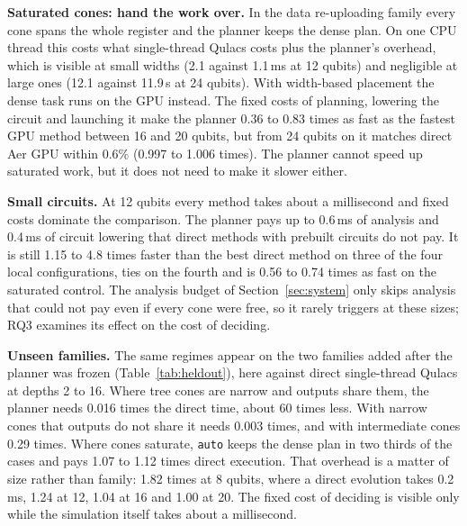 \textbf{Saturated cones: hand the work over.} In the data re-uploading family every cone spans the whole register and the planner keeps the dense plan. On one CPU thread this costs what single-thread Qulacs costs plus the planner's overhead, which is visible at small widths (2.1 against 1.1\,ms at 12 qubits) and negligible at large ones (12.1 against 11.9\,s at 24 qubits). With width-based placement the dense task runs on the GPU instead. The fixed costs of planning, lowering the circuit and launching it make the planner 0.36 to 0.83 times as fast as the fastest GPU method between 16 and 20 qubits, but from 24 qubits on it matches direct Aer GPU within 0.6\% (0.997 to 1.006 times). The planner cannot speed up saturated work, but it does not need to make it slower either.

\textbf{Small circuits.} At 12 qubits every method takes about a millisecond and fixed costs dominate the comparison. The planner pays up to 0.6\,ms of analysis and 0.4\,ms of circuit lowering that direct methods with prebuilt circuits do not pay. It is still 1.15 to 4.8 times faster than the best direct method on three of the four local configurations, ties on the fourth and is 0.56 to 0.74 times as fast on the saturated control. The analysis budget of Section~\ref{sec:system} only skips analysis that could not pay even if every cone were free, so it rarely triggers at these sizes; RQ3 examines its effect on the cost of deciding.

\begin{table}[!t]
\caption{Held-Out Families on One CPU Thread: Planner Time over Direct Qulacs and Cross-Validated Selection Regret, Medians per Stratum at One Collection. The Five Top Strata Are Disjoint and Sum to 480; the Width Rows Break Down Their 405-Case Saturated Subset and Are Not Added Again. F, S and G Count the Full, Separate and Grouped Plans Chosen by \texttt{auto}.}
\label{tab:heldout}
\centering
\setlength{\tabcolsep}{3pt}
\footnotesize
\resizebox{\columnwidth}{!}{}
\end{table}

\textbf{Unseen families.} The same regimes appear on the two families added after the planner was frozen (Table~\ref{tab:heldout}), here against direct single-thread Qulacs at depths 2 to 16. Where tree cones are narrow and outputs share them, the planner needs 0.016 times the direct time, about 60 times less. With narrow cones that outputs do not share it needs 0.003 times, and with intermediate cones 0.29 times. Where cones saturate, \texttt{auto} keeps the dense plan in two thirds of the cases and pays 1.07 to 1.12 times direct execution. That overhead is a matter of size rather than family: 1.82 times at 8 qubits, where a direct evolution takes 0.2\,ms, 1.24 at 12, 1.04 at 16 and 1.00 at 20. The fixed cost of deciding is visible only while the simulation itself takes about a millisecond.


